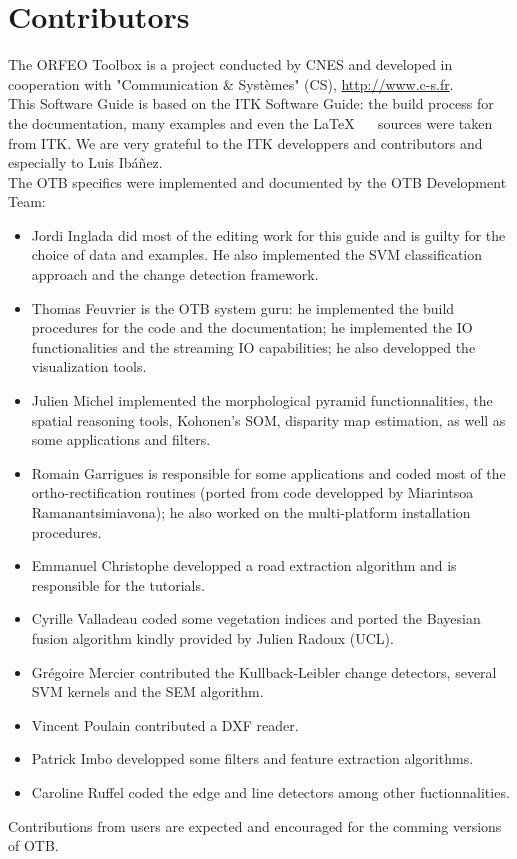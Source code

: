 \chapter*{Contributors}
\noindent

The ORFEO Toolbox is a project conducted by CNES and developed in
cooperation with "Communication \&
  Syst\`{e}mes" (CS), \url{http://www.c-s.fr}.\\

This Software Guide is based on the ITK Software Guide: the build
process for the documentation, many examples and even the \LaTeX~ ~
sources were taken from ITK. We are very grateful to the ITK
developpers and contributors and especially to Luis Ib\'a\~nez.\\

The OTB specifics were implemented and documented by the OTB Development Team:
\begin{itemize}
  \item Jordi Inglada did most of the editing work for this guide and
  is guilty for the choice of data and examples. He also implemented
  the SVM classification approach and the change detection framework.
  \item Thomas Feuvrier is the OTB system guru: he implemented the
  build procedures for the code and the documentation; he implemented
  the IO functionalities and the streaming IO capabilities; he also
  developped the visualization tools.
  \item Julien Michel implemented the morphological pyramid
  functionnalities, the spatial reasoning tools, Kohonen's SOM,
  disparity map estimation, as
  well as some applications and filters.
\item Romain Garrigues is responsible for some applications and coded
  most of the ortho-rectification routines (ported from code
  developped by Miarintsoa Ramanantsimiavona); he also
  worked on the multi-platform installation procedures.
\item Emmanuel Christophe developped a road extraction algorithm and
  is responsible for the tutorials.
  \item Cyrille Valladeau coded some vegetation indices and ported the
  Bayesian fusion algorithm kindly provided by Julien Radoux (UCL).
  \item Gr\'egoire Mercier contributed the Kullback-Leibler change
  detectors, several SVM kernels and the SEM algorithm.
  \item Vincent Poulain contributed a DXF reader. 
  \item Patrick Imbo developped some filters and feature
  extraction algorithms.
  \item Caroline Ruffel coded the edge and line detectors among other
  fuctionnalities.



\end{itemize}

Contributions from users are expected and encouraged for the comming
versions of OTB.

